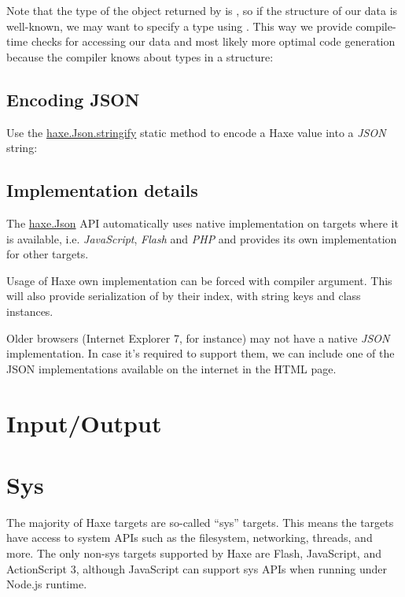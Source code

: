 Note that the type of the object returned by  is , so if the structure of our data is well-known, we may want to specify a type using . This way we provide compile-time checks for accessing our data and most likely more optimal code generation because the compiler knows about types in a structure:

\subsection{Encoding JSON}
\label{std-Json-encoding}

Use the \href{https://api.haxe.org/haxe/Json.html#stringify}{haxe.Json.stringify} static method to encode a Haxe value into a \emph{JSON} string:


\subsection{Implementation details}
\label{std-Json-implementation-details}

The \href{https://api.haxe.org/haxe/Json.html}{haxe.Json} API automatically uses native implementation on targets where it is available, i.e. \emph{JavaScript}, \emph{Flash} and \emph{PHP} and provides its own implementation for other targets.

Usage of Haxe own implementation can be forced with  compiler argument. This will also provide serialization of  by their index,  with string keys and class instances.

Older browsers (Internet Explorer 7, for instance) may not have a native \emph{JSON} implementation. In case it's required to support them, we can include one of the JSON implementations available on the internet in the HTML page.

\section{Input/Output}
\label{std-input-output}

\section{Sys}
\label{std-sys}

The majority of Haxe targets are so-called ``sys'' targets. This means the targets have access to system APIs such as the filesystem, networking, threads, and more. The only non-sys targets supported by Haxe are Flash, JavaScript, and ActionScript 3, although JavaScript can support sys APIs when running under Node.js runtime.


